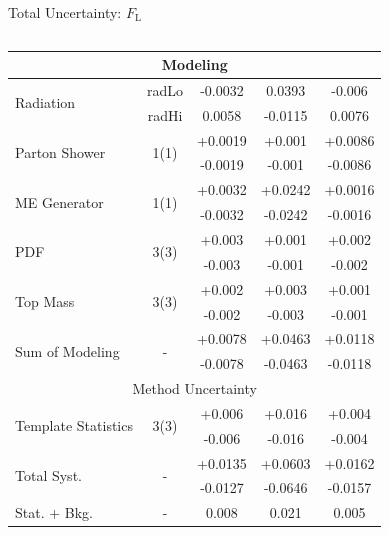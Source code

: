 \documentclass{beamer}
\newcommand*{\fl}{\ensuremath{F_{\text{L}}}\xspace}
\begin{document}
{\begin{frame}{Total Uncertainty: \fl}
\begin{columns}
\begin{table}[h!]
\begin{tabular}{lcccc}
          \hline
          \multicolumn{5}{c}{Modeling} \\\hline
          \multirow{2}{*}{Radiation} & radLo & -0.0032 & 0.0393 & -0.006\\
                                 & radHi & 0.0058 & -0.0115 & 0.0076\\ \hline
          \multirow{2}{*}{Parton Shower} & \multirow{2}{*}{1(1)} & +0.0019 & +0.001 & +0.0086\\
                                 &                       & -0.0019 & -0.001 & -0.0086\\\hline
          \multirow{2}{*}{ME Generator} & \multirow{2}{*}{1(1)} & +0.0032 & +0.0242 & +0.0016\\
                                 &                       & -0.0032 & -0.0242 & -0.0016\\\hline
          \multirow{2}{*}{PDF} & \multirow{2}{*}{3(3)} & +0.003 & +0.001 & +0.002\\
                                 &                       & -0.003 & -0.001 & -0.002\\\hline
          \multirow{2}{*}{Top Mass} & \multirow{2}{*}{3(3)} & +0.002 & +0.003 & +0.001\\
                                 &                       & -0.002 & -0.003 & -0.001\\\hline
          
          \hline\hline
          \multirow{2}{*}{Sum of Modeling} & \multirow{2}{*}{-} & +0.0078 & +0.0463 & +0.0118\\
                                 &                       & -0.0078 & -0.0463 & -0.0118\\\hline
          
          \hline
          \multicolumn{5}{c}{Method Uncertainty} \\\hline
          \multirow{2}{*}{Template Statistics} & \multirow{2}{*}{3(3)} & +0.006 & +0.016 & +0.004\\
                                 &                       & -0.006 & -0.016 & -0.004\\\hline
          
          \hline\hline
          \multirow{2}{*}{Total Syst.} & \multirow{2}{*}{-} & +0.0135 & +0.0603 & +0.0162\\
                                 &                       & -0.0127 & -0.0646 & -0.0157\\\hline
          Stat. + Bkg. & - & 0.008 & 0.021 & 0.005 \\\hline
          

\end{tabular}
\end{table}
\end{columns}
\end{frame}}
\end{document}

